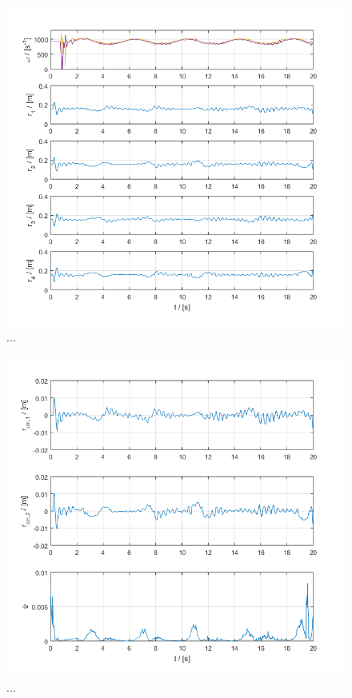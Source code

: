 \begin{figure}[h!]
	\centering
	\includegraphics[width=\columnwidth]{./pictures/mmc_traj_rotorVel_massOff.png}
	\caption{...}
	\label{fig:rotorVel_massOff}
\end{figure}

\begin{figure}[h!]
	\centering
	\includegraphics[width=\columnwidth]{./pictures/mmc_traj_rCm_attErr.png}
	\caption{...}
	\label{fig:rCm_attErr}
\end{figure}
